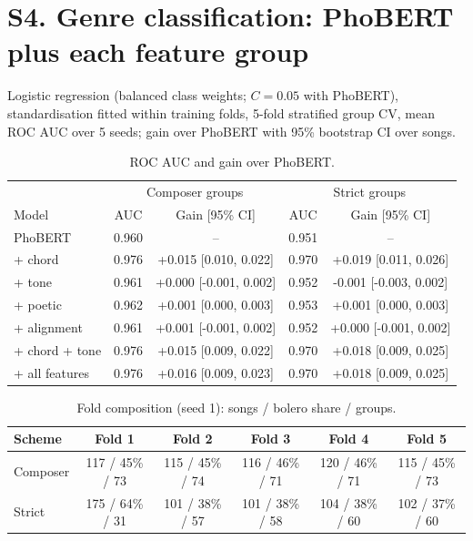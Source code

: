 \documentclass[11pt]{article}
\begin{document}
\section*{S4. Genre classification: PhoBERT plus each feature group}
Logistic regression (balanced class weights; $C=0.05$ with PhoBERT), standardisation fitted within training folds, 5-fold stratified group CV, mean ROC AUC over 5 seeds; gain over PhoBERT with 95\% bootstrap CI over songs.
\begin{table}[H]\centering\caption{ROC AUC and gain over PhoBERT.}
\begin{tabular}{lcccc}\toprule & \multicolumn{2}{c}{Composer groups} & \multicolumn{2}{c}{Strict groups}\\ Model & AUC & Gain [95\% CI] & AUC & Gain [95\% CI]\\\midrule
PhoBERT & 0.960 & -- & 0.951 & --\\
+ chord & 0.976 & +0.015 [0.010, 0.022] & 0.970 & +0.019 [0.011, 0.026]\\
+ tone & 0.961 & +0.000 [-0.001, 0.002] & 0.952 & -0.001 [-0.003, 0.002]\\
+ poetic & 0.962 & +0.001 [0.000, 0.003] & 0.953 & +0.001 [0.000, 0.003]\\
+ alignment & 0.961 & +0.001 [-0.001, 0.002] & 0.952 & +0.000 [-0.001, 0.002]\\
+ chord + tone & 0.976 & +0.015 [0.009, 0.022] & 0.970 & +0.018 [0.009, 0.025]\\
+ all features & 0.976 & +0.016 [0.009, 0.023] & 0.970 & +0.018 [0.009, 0.025]\\
\bottomrule\end{tabular}\end{table}
\begin{table}[H]\centering\caption{Fold composition (seed 1): songs / bolero share / groups.}\small
\begin{tabular}{lccccc}\toprule Scheme & Fold 1 & Fold 2 & Fold 3 & Fold 4 & Fold 5\\\midrule
Composer & 117 / 45\% / 73 & 115 / 45\% / 74 & 116 / 46\% / 71 & 120 / 46\% / 71 & 115 / 45\% / 73\\
Strict & 175 / 64\% / 31 & 101 / 38\% / 57 & 101 / 38\% / 58 & 104 / 38\% / 60 & 102 / 37\% / 60\\
\bottomrule\end{tabular}\end{table}
\end{document}
